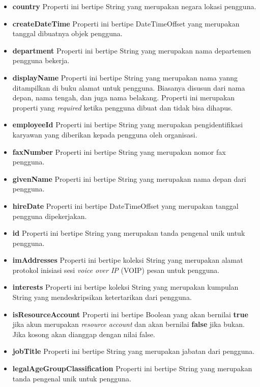 \begin{itemize}
	\item \textbf{country}
	Properti ini bertipe String yang merupakan negara lokasi pengguna.
	\item \textbf{createDateTime}
	Properti ini bertipe DateTimeOffset yang merupakan tanggal dibuatnya objek pengguna.
	\item \textbf{department}
	Properti ini bertipe String yang merupakan nama departemen pengguna bekerja.
	\item \textbf{displayName}
	Properti ini bertipe String yang merupakan nama yanng ditampilkan di buku alamat untuk pengguna. Biasanya disusun dari nama depan, nama tengah, dan juga nama belakang. Properti ini merupakan properti yang \textit{required} ketika pengguna dibuat dan tidak bisa dihapus. 
	 \item \textbf{employeeId}
	Properti ini bertipe String yang merupakan pengidentifikasi karyawan yang diberikan kepada pengguna oleh organisasi.
	\item \textbf{faxNumber}
	Properti ini bertipe String yang merupakan nomor fax pengguna.
	\item \textbf{givenName}
	Properti ini bertipe String yang merupakan nama depan dari pengguna.
	\item \textbf{hireDate}
	Properti ini bertipe DateTimeOffset yang merupakan tanggal pengguna dipekerjakan.
	\item \textbf{id}
	Properti ini bertipe String yang merupakan tanda pengenal unik untuk pengguna.
	\item \textbf{imAddresses}
	Properti ini bertipe koleksi String yang merupakan alamat protokol inisiasi sesi \textit{voice over IP} (VOIP) pesan untuk pengguna.
	\item \textbf{interests}
	Properti ini bertipe koleksi String yang merupakan kumpulan String yang mendeskripsikan ketertarikan dari pengguna.
	\item \textbf{isResourceAccount}
	Properti ini bertipe Boolean yang akan bernilai \textbf{true} jika akun merupakan \textit{resource account} dan akan bernilai \textbf{false} jika bukan. Jika kosong akan dianggap dengan nilai false.
	\item \textbf{jobTitle}
	Properti ini bertipe String yang merupakan jabatan dari pengguna.
	\item \textbf{legalAgeGroupClassification}
	Properti ini bertipe String yang merupakan tanda pengenal unik untuk pengguna.
\end{itemize}

